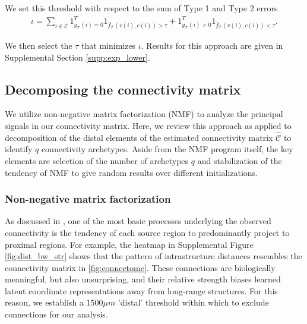 We set this threshold with respect to the sum of Type 1 and Type 2 errors
\begin{eqnarray*}
\iota = \sum_{i \in \mathcal E} 1_{y_{\mathcal T}(i) = 0}^T 1_{\hat f_{\mathcal T}(v(i),c(i)) > \tau} + 1_{y_{\mathcal T}(i) > 0}^T 1_{\hat f_{\mathcal T}(v(i),c(i)) < \tau}  .
\end{eqnarray*}

We then select the $\tau$ that minimizes $\iota$.
Results for this approach are given in Supplemental Section \ref{supp:exp_lower}.

\newpage

\subsection{Decomposing the connectivity matrix}
\label{supp_sec:matrix_factor_methods}

We utilize non-negative matrix factorization (NMF) to analyze the principal signals in our connectivity matrix.
Here, we review this approach as applied to decomposition of the distal elements of the estimated connectivity matrix $\widehat {\mathcal C}$ to identify $q$ connectivity archetypes.
Aside from the NMF program itself, the key elements are selection of the number of archetypes $q$ and stabilization of the tendency of NMF to give random results over different initializations. 

\subsubsection{Non-negative matrix factorization}

As discussed in \citet{Knox2019-ot}, one of the most basic processes underlying the observed connectivity is the tendency of each source region to predominantly project to proximal regions.
For example, the heatmap in Supplemental Figure \ref{fig:dist_bw_str} shows that the pattern of intrastructure distances resembles the connectivity matrix in \ref{fig:connectome}.
These connections are biologically meaningful, but also unsurprising, and their relative strength biases learned latent coordinate representations away from long-range structures.
For this reason, we establish a $1500 \mu m$ 'distal' threshold within which to exclude connections for our analysis.



